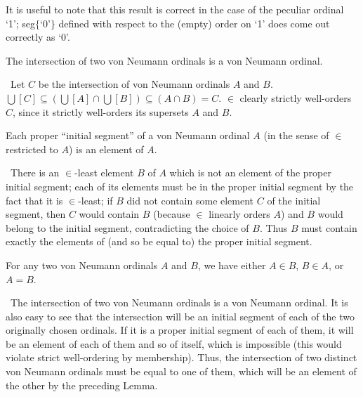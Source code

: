 It is useful to note that this result is correct in the case of the
peculiar ordinal `1'; seg$\{$`0'$\}$ defined with respect to the
(empty) order on `1' does come out correctly as `0'.

\begin{lemme}
 The intersection of two von Neumann ordinals is a
 von Neumann ordinal.
\end{lemme}

\preuve\ Let $C$ be the intersection of von Neumann ordinals $A$
and $B$.  $\bigcup[C] \subseteq (\bigcup[A]\cap\bigcup[B]) \subseteq
(A\cap B)=C$.  $\in$ clearly strictly
well-orders $C$, since 
it strictly well-orders its supersets $A$ and $B$.
\finpreuve

\begin{lemme}
 Each proper ``initial segment'' of a von Neumann ordinal
 $A$ (in the sense of $\in$ restricted to $A$) is an element of $A$.
\end{lemme}

\preuve\ There is an $\in$-least element $B$ of $A$ which is not
an element of the proper initial segment; each of its elements must be
in the proper initial segment by the fact that it is $\in$-least; if
$B$ did not contain some element $C$ of the initial segment, then $C$
would contain $B$ (because $\in$ linearly orders $A$) and $B$ would
belong to the initial segment, contradicting the choice of $B$.
Thus $B$ must contain exactly the elements of (and so be equal to) the
proper initial segment.
\finpreuve

\begin{lemme}
 For any two von Neumann ordinals $A$ and $B$, we
 have either $A\in B$, $B \in A$, or $A = B$.
\end{lemme}

\preuve\ The intersection of two von Neumann
ordinals is a von Neumann ordinal.  It is also easy to see that the
intersection will be an initial segment of each of the two
originally chosen ordinals.  If it is a proper initial segment of each of them,
it will be an element of each of them and so of itself, which is impossible
(this would violate strict well-ordering by
membership).  Thus, the intersection 
of two distinct von Neumann ordinals must be equal to one of them,
which will be an element of the other by the preceding Lemma.
\finpreuve

